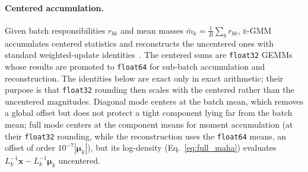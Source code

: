 \documentclass[10pt]{article} %
\newcommand{\egmm}{\textsc{e-GMM}}
\begin{document}
\paragraph{Centered accumulation.} Given batch responsibilities $r_{bk}$ and mean masses $\bar{m}_k = \frac{1}{B}\sum_{b} r_{bk}$, \egmm{} accumulates centered statistics and reconstructs the uncentered ones with standard weighted-update identities~\citep{west1979updating,chan1983updating,pebay2008formulas,schubert2018numerically}. The centered sums are \texttt{float32} GEMMs whose results are promoted to \texttt{float64} for sub-batch accumulation and reconstruction. The identities below are exact only in exact arithmetic; their purpose is that \texttt{float32} rounding then scales with the centered rather than the uncentered magnitudes. Diagonal mode centers at the batch mean, which removes a global offset but does not protect a tight component lying far from the batch mean; full mode centers at the component means for moment accumulation (at their \texttt{float32} rounding, while the reconstruction uses the \texttt{float64} means, an offset of order $10^{-7}|\boldsymbol{\mu}_k|$), but its log-density (Eq.~\eqref{eq:full_maha}) evaluates $L_k^{-1}\mathbf{x} - L_k^{-1}\boldsymbol{\mu}_k$ uncentered.
\end{document}
